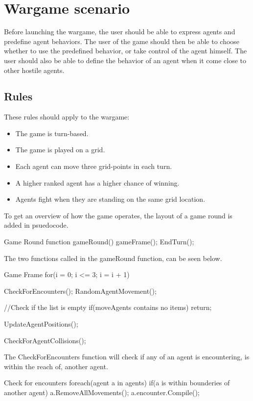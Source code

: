 \chapter{Wargame scenario}

Before launching the wargame, the user should be able to express agents and predefine agent behaviors. The user of the game should then be able to choose whether to use the predefined behavior, or take control of the agent himself. The user should also be able to define the behavior of an agent when it come close to other hostile agents. \\

\section{Rules}
These rules should apply to the wargame:
\begin{itemize}
	\item The game is turn-based.
	\item The game is played on a grid.
	\item Each agent can move three grid-points in each turn.
	\item A higher ranked agent has a higher chance of winning.
	\item Agents fight when they are standing on the same grid location.
\end{itemize}

To get an overview of how the game operates, the layout of a game round is added in psuedocode.

\begin{source}{Game Round}{}
function gameRound()
{
	gameFrame();
	EndTurn();
}
\end{source}

The two functions called in the gameRound function, can be seen below.

\begin{source}{Game Frame}{}
for(i = 0; i <= 3; i = i + 1)
{
	CheckForEncounters();
	RandomAgentMovement();
	
	//Check if the list is empty
	if(moveAgents contains no items)
		return;
		
	UpdateAgentPositions();
	
	CheckForAgentCollisions();
}

\end{source}

The CheckForEncounters function will check if any of an agent is encountering, is within the reach of, another agent.
\begin{source}{Check for encounters}{}
foreach(agent a in agents)
{
	if(a is within bounderies of another agent)
	{
		a.RemoveAllMovements();
		a.encounter.Compile();
	}
}
\end{source}

